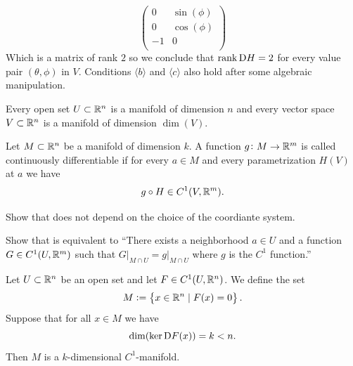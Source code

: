 \documentclass[11pt,a4paper]{article}
\begin{document}
\[
  \begin{pmatrix}
  0 & \sin(\phi)\\
  0 & \cos(\phi)\\
  -1 & 0\\
  \end{pmatrix}
\]
Which is a matrix of rank $2$ so we conclude that $\operatorname{rank} \mathrm{D} H = 2$
for every value pair $(\theta,\phi)$ in $V$. Conditions 
$\langle b \rangle$ and $\langle c \rangle$ also hold after some
algebraic manipulation.
\begin{remark}
  Every open set $U \subset \mathbb{R}^n$ is a manifold of dimension $n$
  and every vector space $V \subset \mathbb{R}^n$ is a manifold of dimension 
  $\dim(V)$.
\end{remark}


\begin{definition}
  \label{def:C-one-function-on-manifolds}
  Let $M \subset \mathbb{R}^n$ be a manifold of dimension $k$. A function
  $g \colon M \to \mathbb{R}^m$ is called continuously differentiable
  if for every $a \in M$ and every parametrization $H(V)$ at $a$
  we have
  \[
    g \circ H \in C^1(V, \mathbb{R}^m).
  \]
\end{definition}

\begin{exercise}
  Show that 
  does not depend on the choice of the coordiante system.
\end{exercise}

\begin{exercise}
  Show that  is equivalent to 
  ``There exists a neighborhood $a \in U$ and a function $G \in C^1(U,\mathbb{R}^m)$
  such that $G \vert_{M \cap U} = g \vert_{M \cap U}$ where $g$ is the $C^1$ 
  function.''
\end{exercise}

\begin{proposition}
  \label{prop:zeros-are-manifold}
  Let $U \subset \mathbb{R}^n$ be an open set and let $F \in C^1(U,\mathbb{R}^n)$.
  We define the set
  \[
    M := \left\{x \in \mathbb{R}^n \mid F(x) = 0\right\}.
  \]
  Suppose that for all $x \in M$ we have
  \[
    \dim(\ker \mathrm{D} F(x)) = k < n.
  \]
  Then $M$ is a $k$-dimensional $C^1$-manifold.
\end{proposition}
\end{document}
